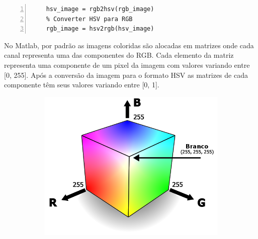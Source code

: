 \documentclass[
	article,			%
	11pt,				%
	oneside,			%
	a4paper,			%
	english,			%
	brazil,				%
	sumario=tradicional
	]{abntex2}
\begin{document}
\begin{lstlisting}[frame=single, numbers=left]
	% Converter RGB para HSV 
	hsv_image = rgb2hsv(rgb_image)
	% Converter HSV para RGB
	rgb_image = hsv2rgb(hsv_image)
\end{lstlisting}

No Matlab, por padrão as imagens coloridas são alocadas em matrizes onde cada
canal representa uma das componentes do RGB. Cada elemento da matriz representa
uma componente de um pixel da imagem com valores variando entre [0, 255]. Após a
conversão da imagem para o formato HSV as matrizes de cada componente têm seus
valores variando entre [0, 1].

\begin{figure}
		\centering
        \begin{subfigure}[b]{0.3\textwidth}
                \includegraphics[width=\textwidth,scale=1]{imagens/ex4/rgbColorspace.png}
                \caption{}
                \label{subfig:cuboRGB}
                

\end{subfigure}
\end{figure}
\end{document}
